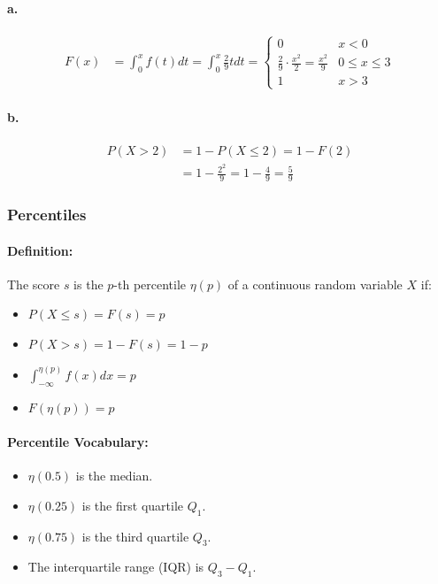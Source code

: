 \paragraph*{a.}
\begin{align*}
    F(x) &= \int_0^x f(t) dt = \int_0^x \frac{2}{9} t dt = \begin{cases}
        0 & x < 0 \\
        \frac{2}{9} \cdot \frac{x^2}{2} = \frac{x^2}{9} & 0 \leq x \leq 3 \\
        1 & x > 3
    \end{cases}
\end{align*}

\paragraph*{b.}
\begin{align*}
    P(X > 2) &= 1 - P(X \leq 2) = 1 - F(2) \\
    &= 1 - \frac{2^2}{9} = 1 - \frac{4}{9} = \frac{5}{9}
\end{align*}

\subsubsection*{Percentiles}
\paragraph*{Definition:} The score $s$ is the $p$-th percentile $\eta (p)$ of a continuous random variable $X$ if:
\begin{itemize}
    \item $P(X \leq s) = F(s) = p$
    \item $P(X > s) = 1 - F(s) = 1 - p$
    \item $\int_{-\infty}^{\eta (p)} f(x) dx = p$
    \item $F(\eta (p)) = p$
\end{itemize}

\paragraph*{Percentile Vocabulary:}
\begin{itemize}
    \item $\eta (0.5)$ is the median.
    \item $\eta (0.25)$ is the first quartile $Q_1$.
    \item $\eta (0.75)$ is the third quartile $Q_3$.
    \item The interquartile range (IQR) is $Q_3 - Q_1$.
\end{itemize}

